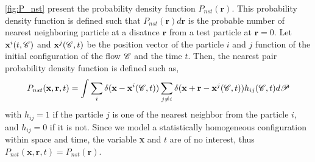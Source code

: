 \ref{fig:P_nst} present the probability density function $P_{nst}(\textbf{r})$. 
This probability density function is defined such that $P_{nst}(\textbf{r})d\textbf{r}$ is the probable number of nearest neighboring particle at a disatnce $\textbf{r}$ from a test particle at $\textbf{r} = 0$. 
Let $\textbf{x}^i(t,\mathscr{C})$ and $\textbf{x}^j(\mathscr{C},t)$ be the position vector of the particle $i$ and $j$ function of the initial configuration of the flow $\mathscr{C}$ and the time $t$. 
Then, the nearest pair probability density function is defined such as, 
\begin{equation}
    P_{nst}(\textbf{x},\textbf{r},t)= 
    \int \sum_{i}\delta(\textbf{x}-\textbf{x}^i(\mathscr{C},t))
    \sum_{j\neq i}\delta(\textbf{x}+\textbf{r}-\textbf{x}^j(\mathscr{C},t)) 
    h_{ij}(\mathscr{C},t) d\mathscr{P} 
    \label{eq:P_nstij}
\end{equation}
with $h_{ij} = 1$ if the particle $j$ is one of the nearest neighbor from the particle $i$, and $h_{ij} = 0$ if it is not. 
Since we model a statistically homogeneous configuration within space and time, the variable \textbf{x} and $t$ are of no interest, thus $P_{nst}(\textbf{x},\textbf{r},t) = P_{nst}(\textbf{r})$. 
